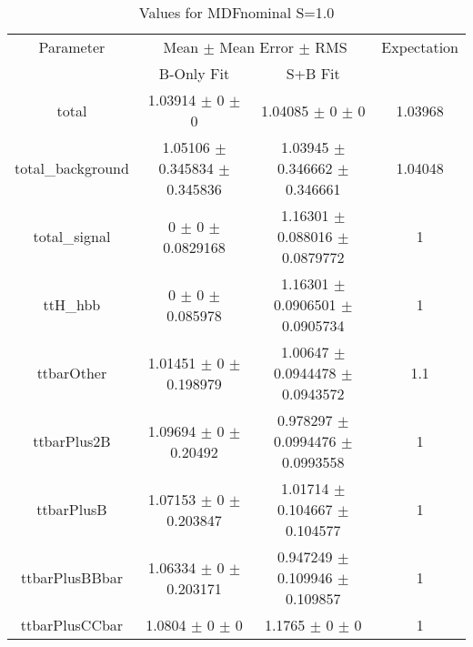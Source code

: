 \begin{table}
\centering
\caption{Values for MDFnominal S=1.0}
\begin{tabular}{cccc}
\toprule
Parameter & \multicolumn{2}{c}{Mean $\pm$ Mean Error $\pm$ RMS} & Expectation\\
 & B-Only Fit & S+B Fit & \\
\midrule
total & \num{1.03914} $\pm$ \num{0} $\pm$ \num{0} & \num{1.04085} $\pm$ \num{0} $\pm$ \num{0} & \num{1.03968}\\
total\_background & \num{1.05106} $\pm$ \num{0.345834} $\pm$ \num{0.345836} & \num{1.03945} $\pm$ \num{0.346662} $\pm$ \num{0.346661} & \num{1.04048}\\
total\_signal & \num{0} $\pm$ \num{0} $\pm$ \num{0.0829168} & \num{1.16301} $\pm$ \num{0.088016} $\pm$ \num{0.0879772} & \num{1}\\
ttH\_hbb & \num{0} $\pm$ \num{0} $\pm$ \num{0.085978} & \num{1.16301} $\pm$ \num{0.0906501} $\pm$ \num{0.0905734} & \num{1}\\
ttbarOther & \num{1.01451} $\pm$ \num{0} $\pm$ \num{0.198979} & \num{1.00647} $\pm$ \num{0.0944478} $\pm$ \num{0.0943572} & \num{1.1}\\
ttbarPlus2B & \num{1.09694} $\pm$ \num{0} $\pm$ \num{0.20492} & \num{0.978297} $\pm$ \num{0.0994476} $\pm$ \num{0.0993558} & \num{1}\\
ttbarPlusB & \num{1.07153} $\pm$ \num{0} $\pm$ \num{0.203847} & \num{1.01714} $\pm$ \num{0.104667} $\pm$ \num{0.104577} & \num{1}\\
ttbarPlusBBbar & \num{1.06334} $\pm$ \num{0} $\pm$ \num{0.203171} & \num{0.947249} $\pm$ \num{0.109946} $\pm$ \num{0.109857} & \num{1}\\
ttbarPlusCCbar & \num{1.0804} $\pm$ \num{0} $\pm$ \num{0} & \num{1.1765} $\pm$ \num{0} $\pm$ \num{0} & \num{1}\\
\bottomrule
\end{tabular}
\end{table}